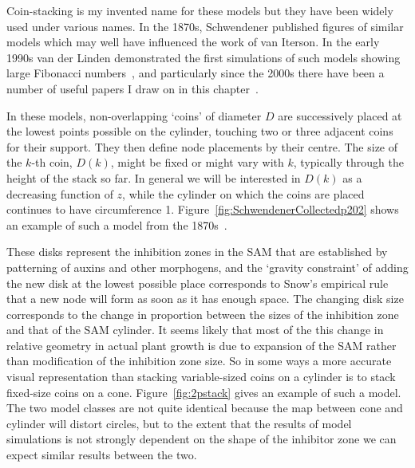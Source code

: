 Coin-stacking is my invented name for these models but they have been widely used under various names. In the 1870s, Schwendener published figures of similar models which may well have influenced the work of van Iterson. In the early 1990s van der Linden demonstrated the first simulations of such models showing large Fibonacci numbers~\cite{jeanBib359}, and particularly since the 2000s there have been a number of  useful papers I draw on in this chapter~\autocite{atelaRhombicTilingsPrimordia2017,hottonPossibleActualPhyllotaxis2006,atelaGeometricDynamicEssence2011}. 

In these models,  non-overlapping `coins' of diameter $D$ are successively placed at the lowest points possible on the cylinder,  touching two or three adjacent coins for their support. They then define node placements by their centre. The size of the $k$-th coin, $D(k)$, might be fixed or might vary with $k$, typically through the height of the stack so far.  In general we will be interested in $D(k)$ as a decreasing function of $z$, while the cylinder on which the coins are placed continues to have circumference 1. Figure~\ref{fig:SchwendenerCollectedp202} shows an example of such a model from the 1870s~\autocite{schwendenerMechanischeTheorieBlattstellungen1878}.%

These disks represent the inhibition zones in the SAM that are established by patterning of auxins and other morphogens, and the `gravity constraint' of adding the new disk at the lowest possible place corresponds to Snow's empirical rule that a new node will form as soon as it has enough space. The changing disk size corresponds to the change in proportion between the sizes of the inhibition zone and that of the SAM cylinder. It seems likely that most of the this change in relative geometry in actual plant growth is due to expansion of the SAM rather than modification of the inhibition zone size. So in some ways a more accurate visual representation than stacking variable-sized coins on a cylinder is to stack fixed-size coins on a cone. Figure~\ref{fig:2pstack} gives an example of such a model. The two model classes are not quite identical because the map between cone and cylinder will distort circles, but to the extent that the results of model simulations is not strongly dependent on the shape of the inhibitor zone we can expect similar results between the two.

